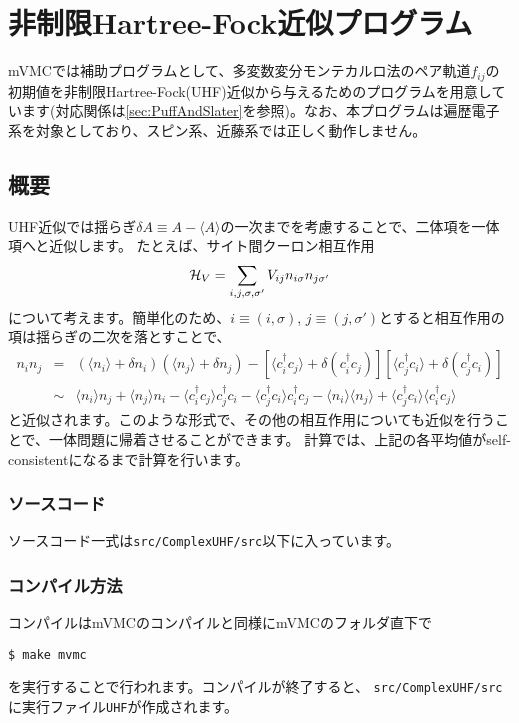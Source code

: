 \appendix
\chapter{非制限Hartree-Fock近似プログラム}
\label{Ch:URHF}
mVMCでは補助プログラムとして、多変数変分モンテカルロ法のペア軌道$f_{ij}$の初期値を非制限Hartree-Fock(UHF)近似から与えるためのプログラムを用意しています(対応関係は\ref{sec:PuffAndSlater}を参照)。なお、本プログラムは遍歴電子系を対象としており、スピン系、近藤系では正しく動作しません。

\section{概要}
UHF近似では揺らぎ$\delta A \equiv A-\langle A \rangle$の一次までを考慮することで、二体項を一体項へと近似します。
たとえば、サイト間クーロン相互作用
\begin{equation}
{\cal H}_V = \sum_{i,j, \sigma, \sigma'}V_{ij} n_ {i\sigma}n_{j\sigma'}
\end{equation}
について考えます。簡単化のため、$i\equiv (i, \sigma)$, $j\equiv (j, \sigma')$とすると相互作用の項は揺らぎの二次を落とすことで、
\begin{eqnarray}
n_ {i}n_{j} &=& (\langle n_{i} \rangle +\delta n_i) (\langle n_{j} \rangle +\delta n_j) - \left[ \langle c_{i}^{\dag}c_j \rangle +\delta (c_{i}^{\dag}c_j ) \right] \left[ \langle c_{j}^{\dag}c_i \rangle +\delta (c_{j}^{\dag}c_i )\right] \nonumber\\
&\sim&\langle n_{i} \rangle n_j+\langle n_{j} \rangle  n_i - \langle c_{i}^{\dag}c_j \rangle  c_{j}^{\dag}c_i  -  \langle c_{j}^{\dag}c_i \rangle c_{i}^{\dag}c_j 
-\langle n_{i} \rangle \langle n_j \rangle +  \langle c_{j}^{\dag}c_i \rangle \langle c_{i}^{\dag}c_j \rangle 
\end{eqnarray}
と近似されます。このような形式で、その他の相互作用についても近似を行うことで、一体問題に帰着させることができます。
計算では、上記の各平均値がself-consistentになるまで計算を行います。

\subsection{ソースコード}
ソースコード一式は\verb|src/ComplexUHF/src|以下に入っています。
\subsection{コンパイル方法}
コンパイルはmVMCのコンパイルと同様にmVMCのフォルダ直下で
\begin{verbatim}
$ make mvmc
\end{verbatim}
を実行することで行われます。コンパイルが終了すると、
\verb|src/ComplexUHF/src|に実行ファイル\verb|UHF|が作成されます。

